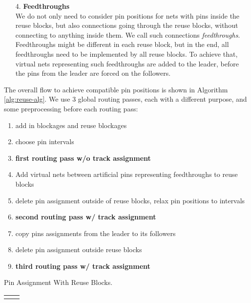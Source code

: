\documentclass[a2paper]{bigsposter}
\begin{document}
\begin{blockrow}
\begin{enumerate}
\item [{4.}] \textbf{Feedthroughs}\\
We do not only need to consider pin positions for nets with pins inside the reuse blocks, but also connections going through the reuse blocks, without connecting to anything inside them. We call such connections \textit{feedthroughs}.
Feedthroughs might be different in each reuse block, but in the end, all feedthroughs need to be implemented by all reuse blocks. To achieve that, virtual nets representing such feedthroughs are added to the leader, before the pins from the leader are forced on the followers.
\end{enumerate}
\blockbreak
{}
The overall flow to achieve compatible pin positions is shown in Algorithm \ref{alg:reuse-alg}.
We use 3 global routing passes, each with a different purpose, and some preprocessing before each routing pass:
\begin{algorithm}[H] 
	\begin{enumerate}
		\item add in blockages and reuse blockages \label{step:add-blockages}
		\item choose pin intervals  \label{PIstep}
		\item \textbf{first routing pass w/o track assignment} \label{step:pass1}
		\item Add virtual nets between artificial pins representing feedthroughs to reuse blocks \label{step:create-artificial-feedthroughs}
		\item delete pin assignment outside of reuse blocks, relax pin positions to intervals \label{step:relaxpositions}
		\item \textbf{second routing pass w/ track assignment}
		\item copy pins assignments from the leader to its followers \label{step:copy-pin-assignment}
		\item delete pin assignment outside reuse blocks
		\item \textbf{third routing pass w/ track assignment}
	\end{enumerate} %
	\caption{Pin Assignment With Reuse Blocks.}
	\label{alg:reuse-alg}
\end{algorithm}
\begin{tabular}{cc}
	\begin{minipage}{0.5\blockwidth}


\end{minipage}
\end{tabular}
\end{blockrow}
\end{document}
